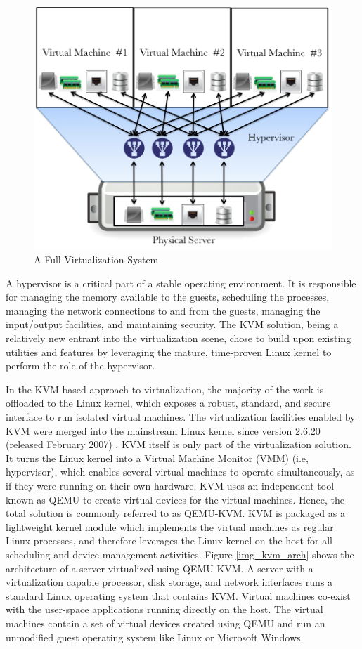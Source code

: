 \begin{figure}[htbp]
\centering
\includegraphics[width=120mm]{full-virt.png}
\caption{A Full-Virtualization System}
\label{img_full_virt}
\end{figure}
A hypervisor is a critical part of a stable operating environment. It is responsible for managing the memory available to the guests, scheduling the processes, managing the network connections to and from the guests, managing the input/output facilities, and maintaining security. The KVM solution, being a relatively new entrant into the virtualization scene, chose to build upon existing utilities and features by leveraging the mature, time-proven Linux kernel to perform the role of the hypervisor. 

In the KVM-based approach to virtualization, the majority of the work is offloaded to the Linux kernel, which exposes a robust, standard, and secure interface to run isolated virtual machines. The virtualization facilities enabled by KVM were merged into the mainstream Linux kernel since version 2.6.20 (released February 2007) \cite{kvm_linux_kernel}. KVM itself is only part of the virtualization solution. It turns the Linux kernel into a Virtual Machine Monitor (VMM) (i.e, hypervisor), which enables several virtual machines to operate simultaneously, as if they were running on their own hardware. KVM uses an independent tool known as QEMU \cite{qemu} to create virtual devices for the virtual machines. Hence, the total solution is commonly referred to as QEMU-KVM. KVM is packaged as a lightweight kernel module which implements the virtual machines as regular Linux processes, and therefore leverages the Linux kernel on the host for all scheduling and device management activities. 
Figure \ref{img_kvm_arch} shows the architecture of a server virtualized using QEMU-KVM. A server with a virtualization capable processor, disk storage, and network interfaces runs a standard Linux operating system that contains KVM. Virtual machines co-exist with the user-space applications running directly on the host. The virtual machines contain a set of virtual devices created using QEMU and run an unmodified guest operating system like Linux or Microsoft Windows.

